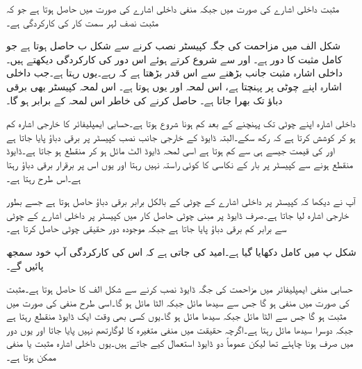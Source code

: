 مثبت داخلی اشارے کی صورت میں  جبکہ منفی داخلی اشارے کی صورت میں  حاصل ہوتا ہے جو کہ مثبت نصف لہر سمت کار کی کارکردگی ہے۔

شکل  الف میں مزاحمت کی جگہ کپیسٹر نصب کرنے سے شکل  ب حاصل ہوتا ہے جو کامل مثبت  کا دور ہے۔ اور  سے شروع کرتے ہوئے اس دور کی کارکردگی دیکھتے ہیں۔داخلی اشارہ مثبت جانب بڑھنے سے  اس قدر بڑھتا ہے کہ  رہے۔یوں  رہتا ہے۔جب داخلی اشارہ اپنے چوٹی  پر پہنچتا ہے، اس لمحہ  اور یوں  ہوتا ہے۔ اس لمحہ کپیسٹر بھی  برقی دباؤ تک بھرا جاتا ہے۔ حاصل کرنے کی خاطر اس لمحہ  کے برابر ہو گا۔

داخلی اشارہ اپنے چوٹی تک پہنچنے کے بعد کم ہونا شروع ہوتا ہے۔حسابی ایمپلیفائر کا خارجی اشارہ  کم ہو کر کوشش کرتا ہے کہ  رکھ سکے۔البتہ ڈایوڈ کے خارجی جانب نصب کپیسٹر پر  برقی دباؤ پایا جاتا ہے اور  کی قیمت جیسے ہی  سے کم ہوتا ہے اسی لمحہ ڈایوڈ الٹ مائل ہو کر منقطع ہو جاتا ہے۔ڈایوڈ منقطع ہونے سے کپیسٹر پر بار کے نکاسی  کا کوئی راستہ نہیں رہتا اور یوں اس پر برقرار  برقی دباؤ رہتا ہے۔اس طرح  رہتا ہے۔ 

آپ نے دیکھا کہ کپیسٹر پر داخلی اشارے کے چوٹی کے بالکل برابر برقی دباؤ حاصل ہوتا ہے جسے بطور خارجی اشارہ  لیا جاتا ہے۔صرف ڈایوڈ پر مبنی چوٹی حاصل کار میں کپیسٹر پر داخلی اشارے کے چوٹی سے  برابر کم برقی دباؤ پایا جاتا ہے جبکہ موجودہ دور حقیقی چوٹی حاصل کرتا ہے۔

شکل  پ میں کامل  دکھایا گیا ہے۔امید کی جاتی ہے کہ اس کی کارکردگی  آپ خود سمجھ پائیں گے۔

حسابی منفی ایمپلیفائر میں مزاحمت کی جگہ ڈایوڈ نصب کرنے سے شکل  الف کا  حاصل ہوتا ہے۔مثبت  کی صورت میں  منفی ہو گا جس سے  سیدھا مائل جبکہ  الٹا مائل ہو گا۔اسی طرح منفی   کی صورت میں  مثبت ہو گا جس سے  الٹا مائل جبکہ  سیدھا مائل ہو گا۔یوں کسی بھی وقت ایک ڈایوڈ منقطع رہتا ہے جبکہ دوسرا سیدھا مائل رہتا ہے۔اگرچہ حقیقت میں منفی متغیرہ کا لوگارتھم نہیں پایا جاتا اور یوں دور میں صرف  ہونا چاہئے تھا لیکن عموماً دو ڈایوڈ استعمال کیے جاتے ہیں۔یوں داخلی اشارہ  مثبت یا منفی ممکن ہوتا ہے۔


